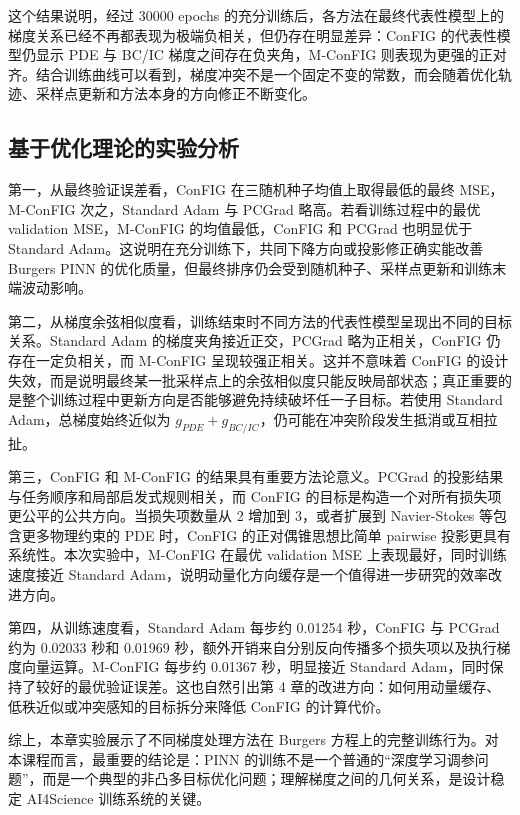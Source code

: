 \documentclass[UTF8,a4paper,12pt,fontset=none]{ctexart}
\begin{document}
这个结果说明，经过 30000 epochs 的充分训练后，各方法在最终代表性模型上的梯度关系已经不再都表现为极端负相关，但仍存在明显差异：ConFIG 的代表性模型仍显示 PDE 与 BC/IC 梯度之间存在负夹角，M-ConFIG 则表现为更强的正对齐。结合训练曲线可以看到，梯度冲突不是一个固定不变的常数，而会随着优化轨迹、采样点更新和方法本身的方向修正不断变化。


\subsection{基于优化理论的实验分析}

第一，从最终验证误差看，ConFIG 在三随机种子均值上取得最低的最终 MSE，M-ConFIG 次之，Standard Adam 与 PCGrad 略高。若看训练过程中的最优 validation MSE，M-ConFIG 的均值最低，ConFIG 和 PCGrad 也明显优于 Standard Adam。这说明在充分训练下，共同下降方向或投影修正确实能改善 Burgers PINN 的优化质量，但最终排序仍会受到随机种子、采样点更新和训练末端波动影响。


第二，从梯度余弦相似度看，训练结束时不同方法的代表性模型呈现出不同的目标关系。Standard Adam 的梯度夹角接近正交，PCGrad 略为正相关，ConFIG 仍存在一定负相关，而 M-ConFIG 呈现较强正相关。这并不意味着 ConFIG 的设计失效，而是说明最终某一批采样点上的余弦相似度只能反映局部状态；真正重要的是整个训练过程中更新方向是否能够避免持续破坏任一子目标。若使用 Standard Adam，总梯度始终近似为 $g_{PDE}+g_{BC/IC}$，仍可能在冲突阶段发生抵消或互相拉扯。


第三，ConFIG 和 M-ConFIG 的结果具有重要方法论意义。PCGrad 的投影结果与任务顺序和局部启发式规则相关，而 ConFIG 的目标是构造一个对所有损失项更公平的公共方向。当损失项数量从 2 增加到 3，或者扩展到 Navier-Stokes 等包含更多物理约束的 PDE 时，ConFIG 的正对偶锥思想比简单 pairwise 投影更具有系统性。本次实验中，M-ConFIG 在最优 validation MSE 上表现最好，同时训练速度接近 Standard Adam，说明动量化方向缓存是一个值得进一步研究的效率改进方向。


第四，从训练速度看，Standard Adam 每步约 0.01254 秒，ConFIG 与 PCGrad 约为 0.02033 秒和 0.01969 秒，额外开销来自分别反向传播多个损失项以及执行梯度向量运算。M-ConFIG 每步约 0.01367 秒，明显接近 Standard Adam，同时保持了较好的最优验证误差。这也自然引出第 4 章的改进方向：如何用动量缓存、低秩近似或冲突感知的目标拆分来降低 ConFIG 的计算代价。


综上，本章实验展示了不同梯度处理方法在 Burgers 方程上的完整训练行为。对本课程而言，最重要的结论是：PINN 的训练不是一个普通的“深度学习调参问题”，而是一个典型的非凸多目标优化问题；理解梯度之间的几何关系，是设计稳定 AI4Science 训练系统的关键。
\end{document}
